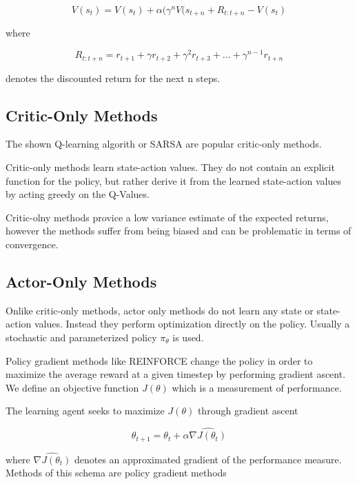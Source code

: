 \begin{equation}
V(s_t) = V(s_t) + \alpha(\gamma^nV(s_{t+n}+R_{t:t+n} - V(s_t)
\end{equation} 

where 

\begin{equation}
R_{t:t+n} = r_{t+1}+\gamma r_{t+2}+\gamma^2 r_{t+3}+ \dots +\gamma^{n-1} r_{t+n}
\end{equation}

denotes the discounted return for the next n steps.
\subsection{Critic-Only Methods}

The shown Q-learning algorith or SARSA are popular critic-only methods.

Critic-only methods learn state-action values. They do not contain an explicit function for the policy, but rather derive it from the learned state-action values by acting greedy on the Q-Values.

Critic-olny methods provice a low variance estimate of the expected returns, however the methods suffer from being biased and can be problematic in terms of convergence.

\subsection{Actor-Only Methods}

Onlike critic-only methods, actor only methods do not learn any state or state-action values.
Instead they perform optimization directly on the policy.
Usually a stochastic and parameterized policy $\pi_\theta$ is used.

Policy gradient methods like REINFORCE change the policy in order to maximize the average reward at a given timestep by performing gradient ascent. \citep{Williams1992}
We define an objective function $J(\theta)$ which is a measurement of performance.

The learning agent seeks to maximize $J(\theta)$ through gradient ascent

\begin{equation}
\theta_{t+1} = \theta_t + \alpha \widehat{\nabla J(\theta_t)}
\end{equation}

where $\widehat{\nabla J(\theta_t)}$ denotes an approximated gradient of the performance measure.
Methods of this schema are policy gradient methods \citep{Sut98} 

